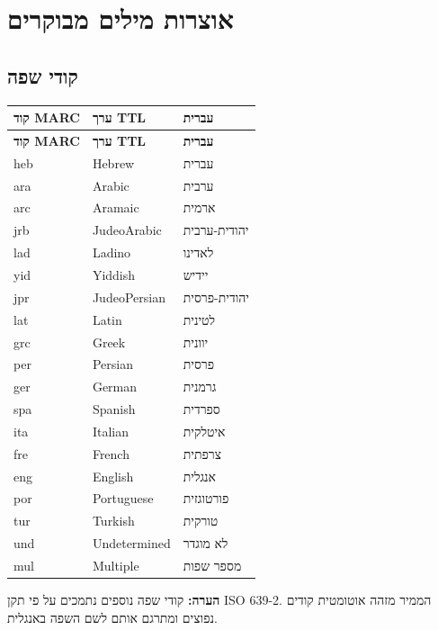 \documentclass[12pt,a4paper]{article}
\begin{document}
\newpage
\section{אוצרות מילים מבוקרים}

\subsection{קודי שפה}

\begin{longtable}{|p{3cm}|L{5cm}|L{8cm}|}
\hline
\textbf{קוד MARC} & \textbf{ערך TTL} & \textbf{עברית} \\
\hline
\endfirsthead
\hline
\textbf{קוד MARC} & \textbf{ערך TTL} & \textbf{עברית} \\
\hline
\endhead
\hline
\endfoot
heb & Hebrew & עברית \\
\hline
ara & Arabic & ערבית \\
\hline
arc & Aramaic & ארמית \\
\hline
jrb & JudeoArabic & יהודית-ערבית \\
\hline
lad & Ladino & לאדינו \\
\hline
yid & Yiddish & יידיש \\
\hline
jpr & JudeoPersian & יהודית-פרסית \\
\hline
lat & Latin & לטינית \\
\hline
grc & Greek & יוונית \\
\hline
per & Persian & פרסית \\
\hline
ger & German & גרמנית \\
\hline
spa & Spanish & ספרדית \\
\hline
ita & Italian & איטלקית \\
\hline
fre & French & צרפתית \\
\hline
eng & English & אנגלית \\
\hline
por & Portuguese & פורטוגזית \\
\hline
tur & Turkish & טורקית \\
\hline
und & Undetermined & לא מוגדר \\
\hline
mul & Multiple & מספר שפות \\
\hline
\end{longtable}

\textbf{הערה:} קודי שפה נוספים נתמכים על פי תקן ISO 639-2. הממיר מזהה אוטומטית קודים נפוצים ומתרגם אותם לשם השפה באנגלית.
\end{document}
